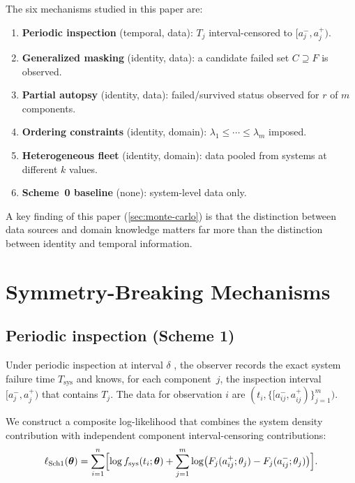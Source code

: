 \documentclass[12pt]{article}
\newcommand{\Tsys}{T_{\mathrm{sys}}}
\newcommand{\fsys}{f_{\mathrm{sys}}}
\newcommand{\btheta}{\boldsymbol{\theta}}
\begin{document}
The six mechanisms studied in this paper are:
\begin{enumerate}
  \item \textbf{Periodic inspection} (temporal, data): $T_j$ interval-censored
    to $[a_j^{-}, a_j^{+})$.
  \item \textbf{Generalized masking} (identity, data): a candidate failed
    set $C \supseteq F$ is observed.
  \item \textbf{Partial autopsy} (identity, data): failed/survived status
    observed for $r$ of $m$ components.
  \item \textbf{Ordering constraints} (identity, domain): $\lambda_1 \leq
    \cdots \leq \lambda_m$ imposed.
  \item \textbf{Heterogeneous fleet} (identity, domain): data pooled from
    systems at different $k$ values.
  \item \textbf{Scheme~0 baseline} (none): system-level data only.
\end{enumerate}

A key finding of this paper (\cref{sec:monte-carlo}) is that the distinction
between data sources and domain knowledge matters far more than the distinction
between identity and temporal information.


\section{Symmetry-Breaking Mechanisms}\label{sec:mechanisms}

\subsection{Periodic inspection (Scheme 1)}\label{sec:periodic}

Under periodic inspection at interval $\delta$ \citep[see][for a
general treatment of interval censoring]{Sun2006}, the observer records the
exact system failure time $\Tsys$ and knows, for each component~$j$, the
inspection interval $[a_j^{-}, a_j^{+})$ that contains $T_j$.
The data for observation $i$ are
$(t_i, \{[a_{ij}^{-}, a_{ij}^{+})\}_{j=1}^{m})$.

We construct a composite log-likelihood that combines the system density
contribution with independent component interval-censoring contributions:
\begin{equation}\label{eq:scheme1-ll}
  \ell_{\text{Sch1}}(\btheta) = \sum_{i=1}^{n}
    \Bigl[\log \fsys(t_i; \btheta)
    + \sum_{j=1}^{m} \log\bigl(F_j(a_{ij}^{+}; \theta_j) -
      F_j(a_{ij}^{-}; \theta_j)\bigr)\Bigr].
\end{equation}
\end{document}

